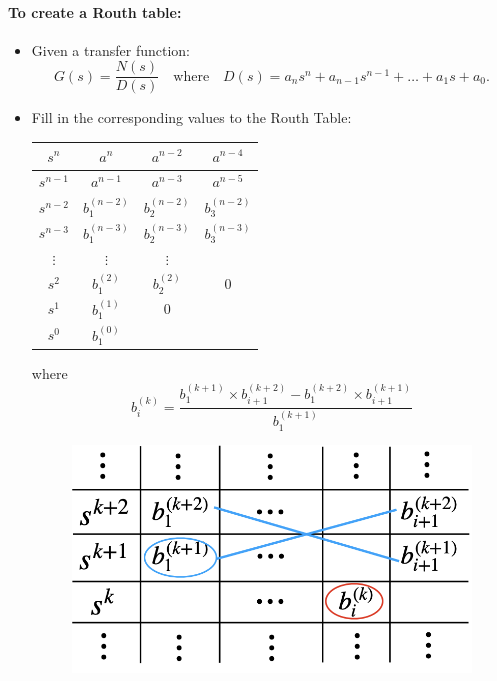\paragraph{\textbf{To create a Routh table:}}
\begin{itemize}
\item Given a transfer function:
    \[
        G(s) = \frac{N(s)}{D(s)}
        \quad \text{where} \quad
        D(s) = a_{n}s^{n}+a_{n-1}s^{n-1}+\ldots+a_{1}s+a_{0}.
    \]
    
    \item Fill in the corresponding values to the Routh Table:
        \begin{table}[H]
        \renewcommand{\arraystretch}{1.3}
            \centering
            \begin{tabular}{c|c|c|c}\hline
                 $s^{n}$ & $a^{n}$ & $a^{n-2}$ & $a^{n-4}$\\ \hline
                 $s^{n-1}$ & $a^{n-1}$ & $a^{n-3}$ & $a^{n-5}$\\ \hline \hline
                 $s^{n-2}$ & $b^{(n-2)}_{1}$ & $b^{(n-2)}_{2}$ & $b^{(n-2)}_{3}$ \\ \hline 
                 $s^{n-3}$ & $b^{(n-3)}_{1}$ & $b^{(n-3)}_{2}$ & $b^{(n-3)}_{3}$\\ \hline
                 $\vdots$&$\vdots$&$\vdots$&\\ \hline
                 $s^{2}$ & $b^{(2)}_{1}$ & $b^{(2)}_{2}$ & 0 \\ \hline
                 $s^{1}$ & $b^{(1)}_{1}$ & 0 & \\ \hline
                 $s^{0}$ & $b^{(0)}_{1}$ & &\\ \hline
            \end{tabular}
         \end{table}
         
         \begin{minipage}{.4\textwidth}
         where 
         \[b_{i}^{(k)} = \frac{b_{1}^{(k+1)}\times b_{i+1}^{(k+2)} - b_{1}^{(k+2)}\times b_{i+1}^{(k+1)}}{b_{1}^{(k+1)}}\]
         \end{minipage}\hfill
        \begin{minipage}{.6\textwidth}
            \begin{figure}[H] 
                \centering
                \includegraphics[width=.7\textwidth]{images/routh.png}
            \end{figure}
        \end{minipage}
        

\end{itemize}
